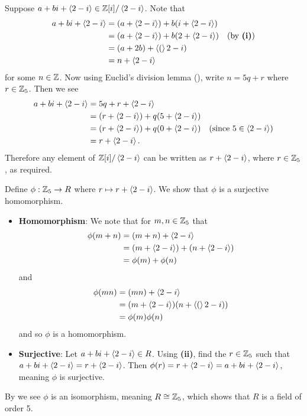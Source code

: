 \begin{questions}
\begin{partquestions}{\roman*}
        \item Suppose $a + bi + \left\langle2-i\right\rangle \in \mathbb{Z}[i]/\left\langle2-i\right\rangle$. Note that
        \begin{align*}
            a + bi + \left\langle2-i\right\rangle &= (a+\left\langle2-i\right\rangle) + b(i + \left\langle2-i\right\rangle)\\
            &= (a+\left\langle2-i\right\rangle) + b(2 + \left\langle2-i\right\rangle) & (\text{by }\textbf{(i)})\\
            &= (a + 2b) + \left\langle(\right\rangle2-i)\\
            &= n + \left\langle2-i\right\rangle
        \end{align*}
        for some $n \in \mathbb{Z}$. Now using Euclid's division lemma (), write $n = 5q + r$ where $r \in \mathbb{Z}_5$. Then we see
        \begin{align*}
            a + bi + \left\langle2-i\right\rangle &= 5q + r + \left\langle2-i\right\rangle\\
            &= (r + \left\langle2-i\right\rangle) + q(5 + \left\langle2-i\right\rangle)\\
            &= (r + \left\langle2-i\right\rangle) + q(0 + \left\langle2-i\right\rangle) & (\text{since } 5 \in \left\langle2-i\right\rangle)\\
            &= r + \left\langle2-i\right\rangle.
        \end{align*}
        Therefore any element of $\mathbb{Z}[i]/\left\langle2-i\right\rangle$ can be written as $r + \left\langle2-i\right\rangle$, where $r \in \mathbb{Z}_5$, as required.
        
        \item Define $\phi: \mathbb{Z}_5 \to R$ where $r \mapsto r + \left\langle2-i\right\rangle$. We show that $\phi$ is a surjective homomorphism.
        \begin{itemize}
            \item \textbf{Homomorphism}: We note that for $m,n \in \mathbb{Z}_5$ that
            \begin{align*}
                \phi(m+n) &= (m+n) + \left\langle2-i\right\rangle\\
                &= (m + \left\langle2-i\right\rangle) + (n + \left\langle2-i\right\rangle)\\
                &= \phi(m) + \phi(n)
            \end{align*}
            and
            \begin{align*}
                \phi(mn) &= (mn) + \left\langle2-i\right\rangle\\
                &= (m + \left\langle2-i\right\rangle)(n + \left\langle(\right\rangle2-i))\\
                &= \phi(m)\phi(n)
            \end{align*}
            and so $\phi$ is a homomorphism.

            \item \textbf{Surjective}: Let $a+bi + \left\langle2-i\right\rangle \in R$. Using \textbf{(ii)}, find the $r \in \mathbb{Z}_5$ such that $a+bi + \left\langle2-i\right\rangle = r + \left\langle2-i\right\rangle$. Then $\phi(r) = r + \left\langle2-i\right\rangle = a+bi + \left\langle2-i\right\rangle$, meaning $\phi$ is surjective.
        \end{itemize}
        By  we see $\phi$ is an isomorphism, meaning $R \cong \mathbb{Z}_5$, which shows that $R$ is a field of order 5.
    \end{partquestions}
    

\end{questions}
